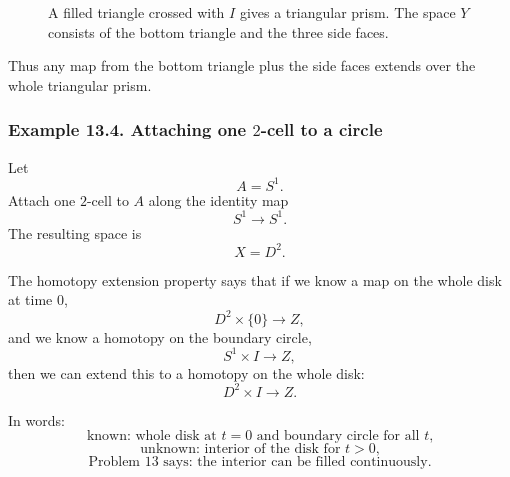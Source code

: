 \documentclass[12pt,a4paper]{article}
\theoremstyle{notespace}
\begin{document}
\begin{figure}[htbp]
	\centering
	\caption{A filled triangle crossed with \(I\) gives a triangular prism. The space \(Y\) consists of the bottom triangle and the three side faces.}
\end{figure}

Thus any map from the bottom triangle plus the side faces extends over the whole triangular prism.

\subsubsection*{Example 13.4. Attaching one \(2\)-cell to a circle}

Let
\[
A=S^1.
\]
Attach one \(2\)-cell to \(A\) along the identity map
\[
S^1\to S^1.
\]
The resulting space is
\[
X=D^2.
\]

The homotopy extension property says that if we know a map on the whole disk at time \(0\),
\[
D^2\times\{0\}\to Z,
\]
and we know a homotopy on the boundary circle,
\[
S^1\times I\to Z,
\]
then we can extend this to a homotopy on the whole disk:
\[
D^2\times I\to Z.
\]

In words:
\[
\text{known: whole disk at \(t=0\) and boundary circle for all \(t\),}
\]
\[
\text{unknown: interior of the disk for \(t>0\),}
\]
\[
\text{Problem 13 says: the interior can be filled continuously.}
\]
\end{document}

